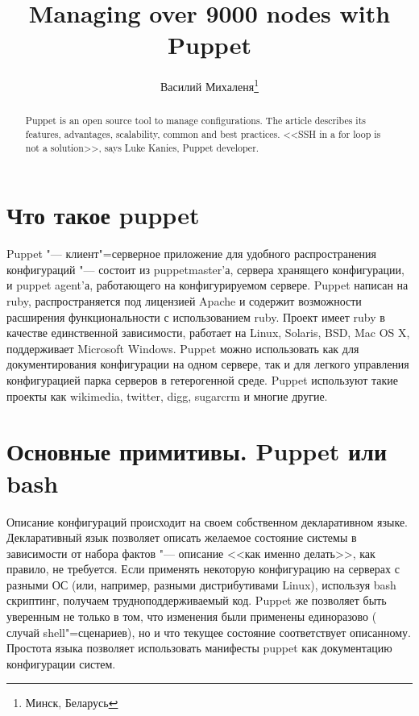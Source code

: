 \documentclass[10pt, a5paper]{article}
\begin{document}
\title{Managing over 9000 nodes with Puppet}%

\author{Василий Михаленя\footnote{Минск, Беларусь}}
\maketitle

\begin{abstract}
Puppet is an open source tool to manage configurations. The article describes its features, advantages, scalability, common and best practices. <<SSH in a for loop is not a solution>>, says Luke Kanies, Puppet developer.
\end{abstract}

\section*{Что такое puppet}

Puppet "--- клиент"=серверное приложение для удобного \linebreak распространения конфигураций "--- состоит из puppetmaster'а, сервера хранящего конфигурации, и puppet agent'а, работающего на конфигурируемом сервере. Puppet написан на ruby, распространяется под лицензией Apache и содержит возможности расширения функциональности с использованием ruby. Проект имеет ruby в качестве единственной зависимости, работает на Linux, Solaris, BSD, Mac OS X, поддерживает Microsoft Windows. Puppet можно использовать как для документирования конфигурации на одном сервере, так и для легкого управления конфигурацией парка серверов в гетерогенной среде. Puppet используют такие проекты как wikimedia, twitter, digg, sugarcrm и многие другие.

\section*{Основные примитивы. Puppet или bash}

Описание конфигураций происходит на своем собственном декларативном языке. Декларативный язык позволяет описать желаемое состояние системы в зависимости от набора фактов "--- описание <<как именно делать>>, как правило, не требуется. Если применять некоторую конфигурацию на серверах с разными ОС (или, например, разными дистрибутивами Linux), используя bash скриптинг, получаем трудноподдерживаемый код. Puppet же позволяет быть уверенным не только в том, что изменения были применены единоразово ( случай shell"=сценариев), но и что текущее состояние соответствует описанному. Простота языка позволяет использовать манифесты puppet как документацию конфигурации систем.
\end{document}
